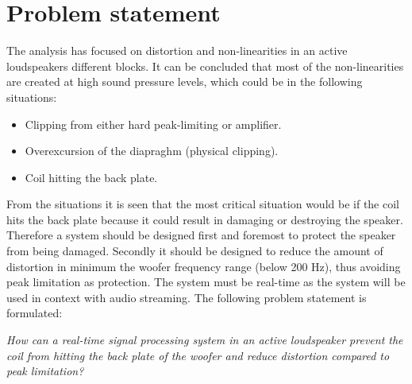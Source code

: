 





%

%

%

%

%

\section{Problem statement} \label{sec:problem_statement}
The analysis has focused on distortion and non-linearities in an active loudspeakers different blocks. It can be concluded that most of the non-linearities are created at high sound pressure levels, which could be in the following situations:
\begin{itemize}
\item Clipping from either hard peak-limiting or amplifier.
\item Overexcursion of the diapraghm (physical clipping). 
\item Coil hitting the back plate. 
\end{itemize}

From the situations it is seen that the most critical situation would be if the coil hits the back plate because it could result in damaging or destroying the speaker. Therefore a system should be designed first and foremost to protect the speaker from being damaged. Secondly it should be designed to reduce the amount of distortion in minimum the woofer frequency range (below 200 Hz), thus avoiding peak limitation as protection. The system must be real-time as the system will be used in context with audio streaming. The following problem statement is formulated:

\begin{center}
\label{ProblemStatement}
\textit{How can a real-time signal processing system in an active loudspeaker prevent the coil from hitting the back plate of the woofer and reduce distortion compared to peak limitation?}
\end{center}

